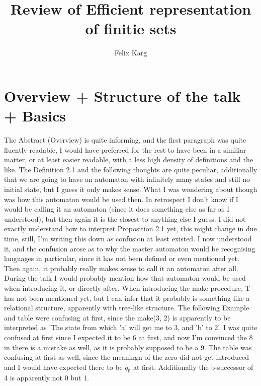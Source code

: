 \documentclass{scrartcl}
\title{Review of Efficient representation of finitie sets}
\author{Felix Karg}
\begin{document}
\maketitle

% 
% 

\section*{Overview + Structure of the talk + Basics}
The Abstract (Overview) is quite informing, and the first paragraph was quite
fluently readable, I would have preferred for the rest to have been in a
similiar matter, or at least easier readable, with a less high density of
definitions and the like. The Definition 2.1 and the following thoughts are
quite peculiar, additionally that we are going to have an automaton with
infinitely many states and still no initial state, but I guess it only makes
sense. What I was wondering about though was how this automaton would be used
then. In retrospect I don't know if I would be calling it an automaton (since
it does something else as far as I understood), but then again it is the
closest to anything else I guess. I did not exactly understand how to interpret
Proposition 2.1 yet, this might change in due time, still, I'm writing this
down as confusion at least existed. I now understood it, and the confusion
arose as to why the master automaton would be recognising languages in
particular, since it has not been defined or even mentioned yet. Then again, it
probably really makes sense to call it an automaton after all. During the talk
I would probably mention how that automaton would be used when introducing it,
or directly after. When introducing the make-procedure, T has not been
mentioned yet, but I can infer that it probably is something like a relational
structure, apparently with tree-like structure. The following Example and table
were confusing at first, since the make(3, 2) is apparently to be interpreted
as 'The state from which 'a' will get me to 3, and 'b' to 2'. I was quite
confused at first since I expected it to be 6 at first, and now I'm convinced
the 8 in there is a mistake as well, as it is probably supposed to be a 9. The
table was confusing at first as well, since the meaningn of the zero did not
get introduced and I would have expected there to be $q_\emptyset$ at first.
Additionally the b-successor of 4 is apparently not 0 but 1.
\end{document}
